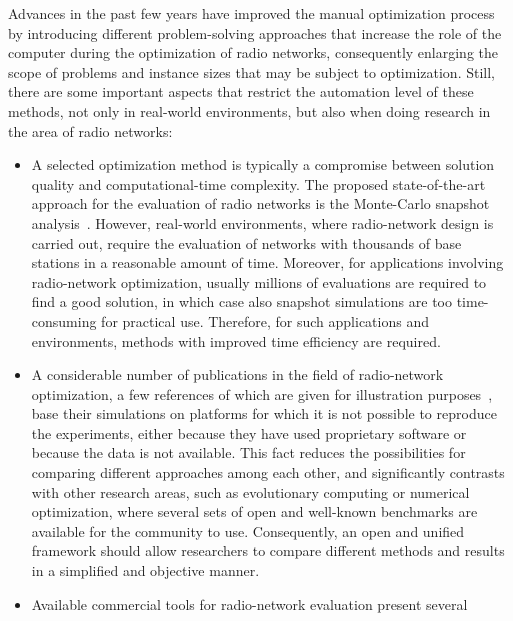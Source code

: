 Advances in the past few years have improved the manual optimization
process by introducing different problem-solving approaches that increase
the role of the computer during the optimization of radio networks,
consequently enlarging the scope of problems and instance sizes that
may be subject to optimization. Still, there are some important aspects
that restrict the automation level of these methods, not only in real-world
environments, but also when doing research in the area of radio networks:
\begin{itemize}
\item A selected optimization method is typically a compromise between solution
quality and computational-time complexity. The proposed state-of-the-art
approach for the evaluation of radio networks is the Monte-Carlo snapshot
analysis~\cite{Turke-Efficient_methods_for_WCDMA_radio_network_planning_and_optimization:2007,Wacker-Static_simulator_for_studying_WCDMA_radio_network_planning;1999}.
However, real-world environments, where radio-network design is carried
out, require the evaluation of networks with thousands of base stations
in a reasonable amount of time. Moreover, for applications involving
radio-network optimization, usually millions of evaluations are required
to find a good solution, in which case also snapshot simulations are
too time-consuming for practical use. Therefore, for such applications
and environments, methods with improved time efficiency are required.
\item A considerable number of publications in the field of radio-network
optimization, a few references of which are given for illustration
purposes~\cite{Amaldi-Radio_planning_and_coverage_optimization_of_3G_networks:2008,chen2008automated,Chen-Fast_algorithm_for_large_scale_UMTS_coverage_planning:2009,Antenna.azimuth.tilt:2009,Antenna.Configuration:2008,Siomina:Minimum.pilot.power.for.service.coverage},
base their simulations on platforms for which it is not possible to
reproduce the experiments, either because they have used proprietary
software or because the data is not available. This fact reduces the
possibilities for comparing different approaches among each other,
and significantly contrasts with other research areas, such as evolutionary
computing or numerical optimization, where several sets of open and
well-known benchmarks are available for the community to use. Consequently,
an open and unified framework should allow researchers to compare
different methods and results in a simplified and objective manner.
\item Available commercial tools for radio-network evaluation present several

\end{itemize}

